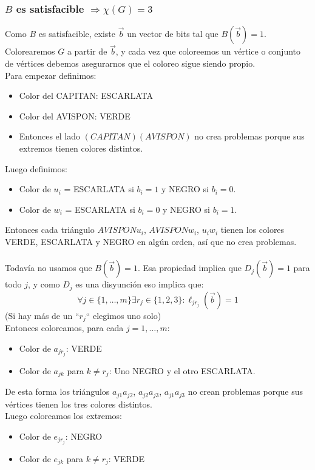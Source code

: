 \documentclass[11pt, a4paper]{article}
\theoremstyle{definition}
\begin{document}
\subsubsection*{$B$ es satisfacible $\Rightarrow \chi(G) = 3$}
Como $B$ es satisfacible, existe $\vec{b}$ un vector de bits tal que $B(\vec{b}) = 1$.\\
Colorearemos $G$ a partir de $\vec{b}$, y cada vez que coloreemos un vértice o conjunto de vértices debemos asegurarnos que el
coloreo sigue siendo propio.\\
Para empezar definimos:
\begin{itemize}
    \item Color del CAPITAN: ESCARLATA
    \item Color del AVISPON: VERDE
    \item Entonces el lado $(CAPITAN)(AVISPON)$ no crea problemas porque sus extremos tienen colores distintos.
\end{itemize}
Luego definimos:
\begin{itemize}
    \item Color de $u_i$ = ESCARLATA si $b_i = 1$ y NEGRO si $b_i = 0$.
    \item Color de $w_i$ = ESCARLATA si $b_i = 0$ y NEGRO si $b_i = 1$.
\end{itemize}
Entonces cada triángulo $AVISPON u_i$, $AVISPON w_i$, $u_i w_i$ tienen los colores VERDE, ESCARLATA y NEGRO en algún
orden, así que no crea problemas.\\ \\
Todavía no usamos que $B(\vec{b}) = 1$. Esa propiedad implica que $D_j(\vec{b}) = 1$ para todo $j$, y como $D_j$ es una disyunción eso
implica que:
\[
\forall j \in \{1, \ldots, m\} \exists r_j \in \{1, 2, 3\} : \ell_{jr_j}(\vec{b}) = 1
\]
(Si hay más de un “$r_j$“ elegimos uno solo)\\
Entonces coloreamos, para cada $j = 1, \ldots, m$:
\begin{itemize}
    \item Color de $a_{jr_j}$: VERDE
    \item Color de $a_{jk}$ para $k \neq r_j$: Uno NEGRO y el otro ESCARLATA.
\end{itemize}
De esta forma los triángulos $a_{j1}a_{j2}$, $a_{j2}a_{j3}$, $a_{j1}a_{j3}$ no crean problemas porque sus vértices tienen los tres colores distintos.\\
Luego coloreamos los extremos:
\begin{itemize}
    \item Color de $e_{jr_j}$: NEGRO
    \item Color de $e_{jk}$ para $k \neq r_j$: VERDE
\end{itemize}
\end{document}
